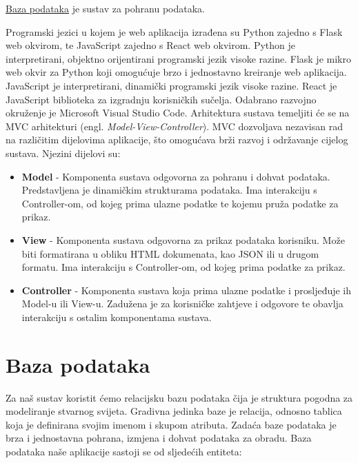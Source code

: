 	\underline{Baza podataka} je sustav za pohranu podataka.

	Programski jezici u kojem je web aplikacija izrađena su Python zajedno s Flask web okvirom, te JavaScript zajedno s React web okvirom. Python je interpretirani, objektno orijentirani programski jezik visoke razine. Flask je mikro web okvir za Python koji omogućuje brzo i jednostavno kreiranje web aplikacija. JavaScript je interpretirani, dinamički programski jezik visoke razine. React je JavaScript biblioteka za izgradnju korisničkih sučelja. Odabrano razvojno okruženje je Microsoft Visual Studio Code.
	Arhitektura sustava temeljiti će se na MVC arhitekturi (engl. \textit{Model-View-Controller}). MVC dozvoljava nezavisan rad na različitim dijelovima aplikacije, što omogućava brži razvoj i održavanje cijelog sustava. Njezini dijelovi su:
	\begin{itemize}
		\item \textbf{Model} - Komponenta sustava odgovorna za pohranu i dohvat podataka. Predstavljena je dinamičkim strukturama podataka. Ima interakciju s Controller-om, od kojeg prima ulazne podatke te kojemu pruža podatke za prikaz.
		\item \textbf{View} - Komponenta sustava odgovorna za prikaz podataka korisniku. Može biti formatirana u obliku HTML dokumenata, kao JSON ili u drugom formatu. Ima interakciju s Controller-om, od kojeg prima podatke za prikaz.
		\item \textbf{Controller} - Komponenta sustava koja prima ulazne podatke i prosljeđuje ih Model-u ili View-u. Zadužena je za korisničke zahtjeve i odgovore te obavlja interakciju s ostalim komponentama sustava.
	\end{itemize}

	

	\pagebreak
				
		\section{Baza podataka}
			
			
		
		\textrm{Za naš sustav koristit ćemo relacijsku bazu podataka čija je struktura pogodna za modeliranje stvarnog svijeta. Gradivna jedinka baze je relacija, odnosno tablica koja je definirana svojim imenom i skupom atributa. Zadaća baze podataka je brza i jednostavna pohrana, izmjena i dohvat podataka za obradu. Baza podataka naše aplikacije sastoji se od sljedećih entiteta:}
		
